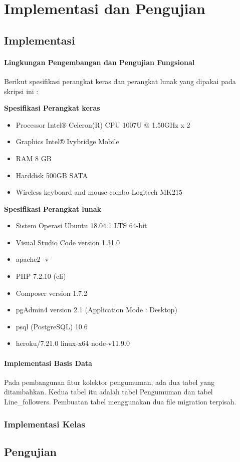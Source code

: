 \chapter{Implementasi dan Pengujian}
\label{chap:implementasiDanPengujian}

\section{Implementasi}
\subsubsection{Lingkungan Pengembangan dan Pengujian Fungsional}
Berikut spesifikasi perangkat keras dan perangkat lunak yang dipakai pada skripsi ini :

\textbf{Spesifikasi Perangkat keras}
\begin{itemize}
\item Processor Intel® Celeron(R) CPU 1007U @ 1.50GHz x 2 
\item Graphics Intel® Ivybridge Mobile
\item RAM 8 GB
\item Harddisk 500GB SATA
\item Wireless keyboard and mouse combo Logitech MK215
\end{itemize}

\textbf{Spesifikasi Perangkat lunak}
\begin{itemize}
\item Sistem Operasi Ubuntu 18.04.1 LTS 64-bit
\item Visual Studio Code version 1.31.0
\item apache2 -v
\item PHP 7.2.10 (cli)
\item Composer version 1.7.2
\item pgAdmin4 version 2.1 (Application Mode : Desktop)
\item psql (PostgreSQL) 10.6
\item heroku/7.21.0 linux-x64 node-v11.9.0
\end{itemize}

\subsubsection{Implementasi Basis Data}
Pada pembangunan fitur kolektor pengumuman, ada dua tabel yang ditambahkan. Kedua tabel itu adalah tabel Pengumuman dan tabel Line\_followers. Pembuatan tabel menggunakan dua file migration terpisah.

\subsection{Implementasi Kelas}

\section{Pengujian}